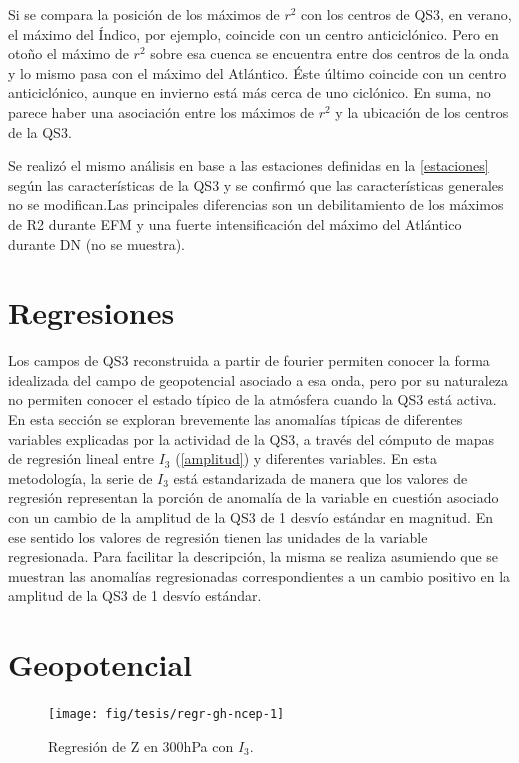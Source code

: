 \documentclass[spanish,a4paper,12pt,oneside]{book}
\begin{document}
Si se compara la posición de los máximos de \(r^2\) con los centros de
QS3, en verano, el máximo del Índico, por ejemplo, coincide con un
centro anticiclónico. Pero en otoño el máximo de \(r^2\) sobre esa
cuenca se encuentra entre dos centros de la onda y lo mismo pasa con el
máximo del Atlántico. Éste último coincide con un centro anticiclónico,
aunque en invierno está más cerca de uno ciclónico. En suma, no parece
haber una asociación entre los máximos de \(r^2\) y la ubicación de los
centros de la QS3.

Se realizó el mismo análisis en base a las estaciones definidas en la
\autoref{estaciones} según las características de la QS3 y se confirmó
que las características generales no se modifican.Las principales
diferencias son un debilitamiento de los máximos de R2 durante EFM y una
fuerte intensificación del máximo del Atlántico durante DN (no se
muestra).

\section{Regresiones}\label{regresiones}

Los campos de QS3 reconstruida a partir de fourier permiten conocer la
forma idealizada del campo de geopotencial asociado a esa onda, pero por
su naturaleza no permiten conocer el estado típico de la atmósfera
cuando la QS3 está activa. En esta sección se exploran brevemente las
anomalías típicas de diferentes variables explicadas por la actividad de
la QS3, a través del cómputo de mapas de regresión lineal entre \(I_3\)
(\autoref{amplitud}) y diferentes variables. En esta metodología, la
serie de \(I_3\) está estandarizada de manera que los valores de
regresión representan la porción de anomalía de la variable en cuestión
asociado con un cambio de la amplitud de la QS3 de 1 desvío estándar en
magnitud. En ese sentido los valores de regresión tienen las unidades de
la variable regresionada. Para facilitar la descripción, la misma se
realiza asumiendo que se muestran las anomalías regresionadas
correspondientes a un cambio positivo en la amplitud de la QS3 de 1
desvío estándar.

\section*{Geopotencial}

\begin{landscape}\begin{figure}

{\centering \texttt{[image: fig/tesis/regr-gh-ncep-1]} 

}

\caption{Regresión de Z en 300hPa con $I_3$.}\label{fig:regr-gh-ncep}
\end{figure}
\end{landscape}
\end{document}
